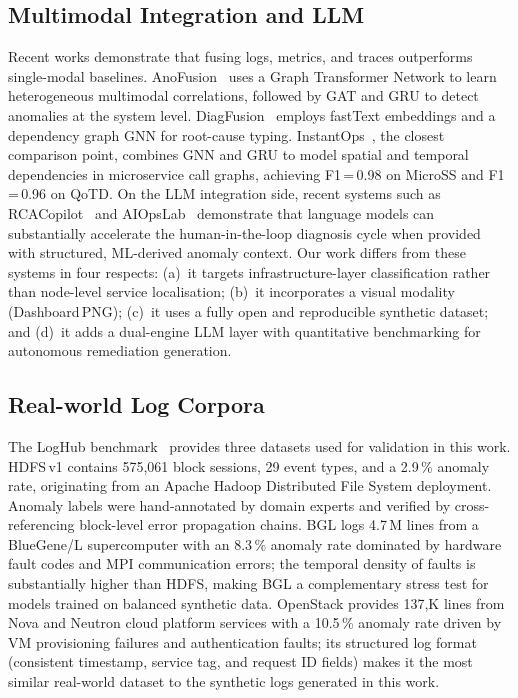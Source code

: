\documentclass[5p, times]{elsarticle}
\begin{document}
\subsection{Multimodal Integration and LLM}
Recent works demonstrate that fusing logs, metrics, and traces outperforms single-modal baselines. AnoFusion~\cite{zhao2023anofusion} uses a Graph Transformer Network to learn heterogeneous multimodal
correlations, followed by GAT and GRU to detect anomalies at the system level. DiagFusion~\cite{zhang2023diagfusion} employs
fastText embeddings and a dependency graph GNN for root-cause typing. InstantOps~\cite{instantops2024}, the closest comparison point, combines GNN and GRU to model spatial and temporal dependencies in microservice call graphs, achieving F1\,=\,0.98 on
MicroSS and F1\,=\,0.96 on QoTD. On the LLM integration side, recent systems such as RCACopilot~\cite{chen2023rcacopilot} and AIOpsLab~\cite{chen2024aiopslab} demonstrate that language models can substantially accelerate the human-in-the-loop diagnosis cycle when provided with structured, ML-derived anomaly context. Our work
differs from these systems in four respects: (a)~it targets infrastructure-layer classification rather than node-level service localisation; (b)~it incorporates a visual modality
(Dashboard\,PNG); (c)~it uses a fully open and reproducible synthetic dataset; and (d)~it adds a dual-engine LLM layer with quantitative benchmarking for autonomous remediation generation.

\subsection{Real-world Log Corpora}
The LogHub benchmark~\cite{loghub2023} provides three datasets used for validation in this work. HDFS\,v1 contains 575{,}061 block sessions, 29 event types, and a 2.9\,\% anomaly rate,
originating from an Apache Hadoop Distributed File System deployment. Anomaly labels were hand-annotated by domain experts and verified by
cross-referencing block-level error propagation chains. BGL logs 4.7\,M lines from a BlueGene/L supercomputer with an 8.3\,\% anomaly rate dominated by hardware fault codes and MPI communication errors; the temporal density of faults is substantially higher than HDFS, making BGL a complementary stress test for models trained on
balanced synthetic data. OpenStack provides 137{,}K lines from Nova and Neutron cloud platform services with a 10.5\,\% anomaly rate driven by VM provisioning failures and authentication faults;
its structured log format (consistent timestamp, service tag, and request ID fields) makes it the most similar real-world dataset to the synthetic logs generated in this work.
\end{document}
